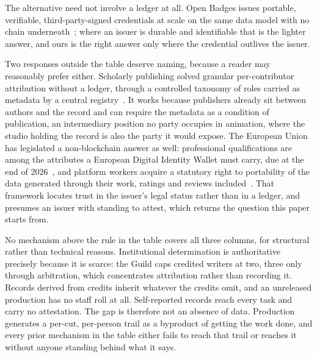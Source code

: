 The alternative need not involve a ledger at all. Open Badges issues portable, verifiable,
third-party-signed credentials at scale on the same data model with no chain
underneath~\cite{openbadges3}; where an issuer is durable and identifiable that is the
lighter answer, and ours is the right answer only where the credential outlives the
issuer.

Two responses outside the table deserve naming, because a reader may reasonably prefer
either. Scholarly publishing solved granular per-contributor attribution without a ledger,
through a controlled taxonomy of roles carried as metadata by a central
registry~\cite{hosseini2026credit}. It works because publishers already sit between
authors and the record and can require the metadata as a condition of publication, an
intermediary position no party occupies in animation, where the studio holding the record
is also the party it would expose. The European Union has legislated a non-blockchain
answer as well: professional qualifications are among the attributes a European Digital
Identity Wallet must carry, due at the end of 2026~\cite{eu2024eudi}, and platform workers
acquire a statutory right to portability of the data generated through their work, ratings
and reviews included~\cite{eu2024platformwork}. That framework locates trust in the
issuer's legal status rather than in a ledger, and presumes an issuer with standing to
attest, which returns the question this paper starts from.

No mechanism above the rule in the table covers all three columns, for structural rather
than technical reasons. Institutional determination is authoritative precisely because it
is scarce: the Guild caps credited writers at two, three only through arbitration, which
concentrates attribution rather than recording it. Records derived from credits inherit
whatever the credits omit, and an unreleased production has no staff roll at all.
Self-reported records reach every task and carry no attestation. The gap is therefore not
an absence of data. Production generates a per-cut, per-person trail as a byproduct of
getting the work done, and every prior mechanism in the table either fails to reach that
trail or reaches it without anyone standing behind what it says.
